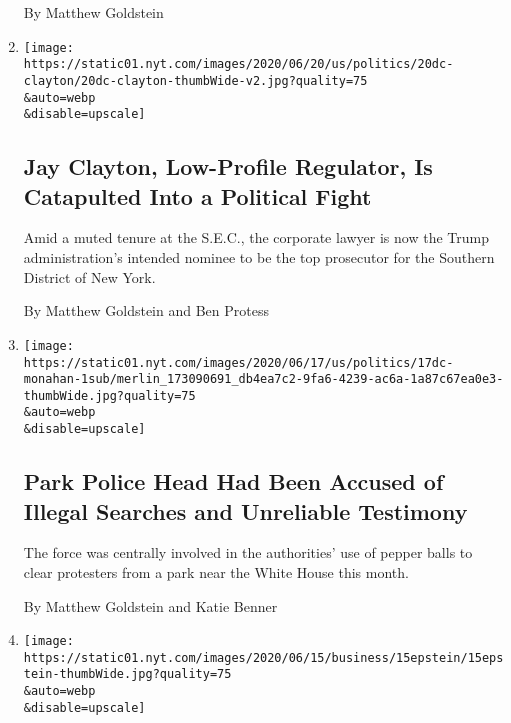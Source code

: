 \begin{enumerate}
  By Matthew Goldstein
\item
  \href{/2020/06/20/business/jay-clayton-sdny-sec.html}{}

  \texttt{[image: https://static01.nyt.com/images/2020/06/20/us/politics/20dc-clayton/20dc-clayton-thumbWide-v2.jpg?quality=75\\\&auto=webp\\\&disable=upscale]}

  \hypertarget{jay-clayton-low-profile-regulator-is-catapulted-into-a-political-fight}{%
  \subsection{Jay Clayton, Low-Profile Regulator, Is Catapulted Into a
  Political
  Fight}\label{jay-clayton-low-profile-regulator-is-catapulted-into-a-political-fight}}

  Amid a muted tenure at the S.E.C., the corporate lawyer is now the
  Trump administration's intended nominee to be the top prosecutor for
  the Southern District of New York.

  By Matthew Goldstein and Ben Protess
\item
  \href{/2020/06/18/us/politics/park-police-gregory-monahan.html}{}

  \texttt{[image: https://static01.nyt.com/images/2020/06/17/us/politics/17dc-monahan-1sub/merlin\_173090691\_db4ea7c2-9fa6-4239-ac6a-1a87c67ea0e3-thumbWide.jpg?quality=75\\\&auto=webp\\\&disable=upscale]}

  \hypertarget{park-police-head-had-been-accused-of-illegal-searches-and-unreliable-testimony}{%
  \subsection{Park Police Head Had Been Accused of Illegal Searches and
  Unreliable
  Testimony}\label{park-police-head-had-been-accused-of-illegal-searches-and-unreliable-testimony}}

  The force was centrally involved in the authorities' use of pepper
  balls to clear protesters from a park near the White House this month.

  By Matthew Goldstein and Katie Benner
\item
  \href{/2020/06/15/business/virgin-islands-jeffrey-epstein-bank.html}{}

  \texttt{[image: https://static01.nyt.com/images/2020/06/15/business/15epstein/15epstein-thumbWide.jpg?quality=75\\\&auto=webp\\\&disable=upscale]}

  \hypertarget{virgin-islands-again-questions-epstein-estate-transactions}{%
}
\end{enumerate}
